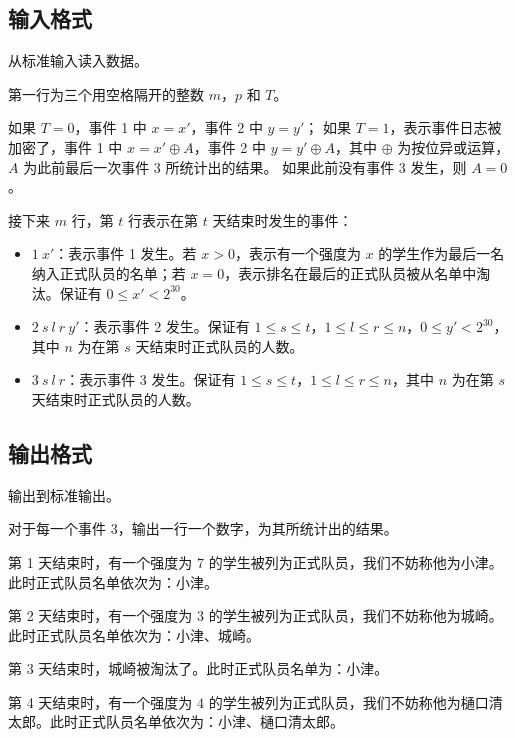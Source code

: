 \subsection*{输入格式}

从标准输入读入数据。

第一行为三个用空格隔开的整数 $m$，$p$ 和 $T$。

如果 $T = 0$，事件 1 中 $x = x'$，事件 2 中 $y = y'$；
如果 $T = 1$，表示事件日志被加密了，事件 1 中 $x = x' \oplus A$，事件 2 中 $y = y' \oplus A$，其中 $\oplus$ 为按位异或运算，$A$ 为此前最后一次事件 3 所统计出的结果。
如果此前没有事件 3 发生，则 $A = 0$。

接下来 $m$ 行，第 $t$ 行表示在第 $t$ 天结束时发生的事件：

\begin{itemize}
    \item $1 \ x'$：表示事件 1 发生。若 $x > 0$，表示有一个强度为 $x$ 的学生作为最后一名纳入正式队员的名单；若 $x = 0$，表示排名在最后的正式队员被从名单中淘汰。保证有 $0 \le x' < 2^{30}$。
    \item $2 \ s \ l \ r \ y'$：表示事件 2 发生。保证有 $1 \le s \le t$，$1 \le l \le r \le n$，$0 \le y' < 2^{30}$，其中 $n$ 为在第 $s$ 天结束时正式队员的人数。
    \item $3 \ s \ l \ r$：表示事件 3 发生。保证有 $1 \le s \le t$，$1 \le l \le r \le n$，其中 $n$ 为在第 $s$ 天结束时正式队员的人数。
\end{itemize}

\subsection*{输出格式}

输出到标准输出。

对于每一个事件 3，输出一行一个数字，为其所统计出的结果。

\examplebox*{}{}

第 1 天结束时，有一个强度为 $7$ 的学生被列为正式队员，我们不妨称他为小津。此时正式队员名单依次为：小津。

第 2 天结束时，有一个强度为 $3$ 的学生被列为正式队员，我们不妨称他为城崎。此时正式队员名单依次为：小津、城崎。

第 3 天结束时，城崎被淘汰了。此时正式队员名单为：小津。

第 4 天结束时，有一个强度为 $4$ 的学生被列为正式队员，我们不妨称他为樋口清太郎。此时正式队员名单依次为：小津、樋口清太郎。

